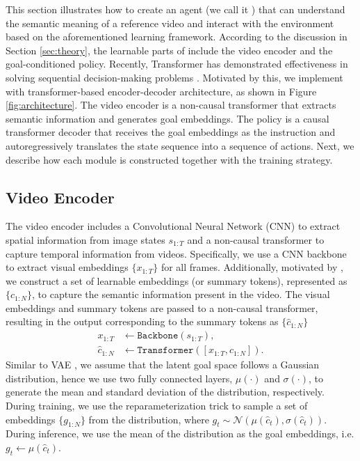 \documentclass[11pt, a4paper, logo, one column]{craftjarvis}
\begin{document}
This section illustrates how to create an agent (we call it \agent) that can understand the semantic meaning of a reference video and interact with the environment based on the aforementioned learning framework. According to the discussion in Section \ref{sec:theory}, the learnable parts of \agent include the video encoder and the goal-conditioned policy. Recently, Transformer \citep{transformer} has demonstrated effectiveness in solving sequential decision-making problems \citep{stable, dt, rt-1}. 
Motivated by this, we implement \agent with transformer-based encoder-decoder architecture, as shown in Figure \ref{fig:architecture}. The video encoder is a non-causal transformer that extracts semantic information and generates goal embeddings. The policy is a causal transformer decoder that receives the goal embeddings as the instruction and autoregressively translates the state sequence into a sequence of actions. Next, we describe how each module is constructed together with the training strategy. 

\subsection{Video Encoder}
The video encoder includes a Convolutional Neural Network (CNN) to extract spatial information from image states $s_{1:T}$ and a non-causal transformer to capture temporal information from videos. 
Specifically, we use a CNN backbone to extract visual embeddings $\{x_{1:T}\}$ for all frames.
Additionally, motivated by \cite{bert, vit}, we construct a set of learnable embeddings (or summary tokens), represented as $\{c_{1:N}\}$, to capture the semantic information present in the video. The visual embeddings and summary tokens are passed to a non-causal transformer, resulting in the output corresponding to the summary tokens as $\{\hat{c}_{1:N}\}$
\begin{equation}\label{eq:video_encoder}
\begin{aligned}
x_{1:T} &\leftarrow \texttt{Backbone}(s_{1:T}), \\
\hat{c}_{1:N} &\leftarrow \texttt{Transformer}(\left[ x_{1:T}, c_{1:N} \right]). 
\end{aligned}
\end{equation}
Similar to VAE \citep{vae}, we assume that the latent goal space follows a Gaussian distribution, hence we use two fully connected layers, $\mu(\cdot)$ and $\sigma(\cdot)$, to generate the mean and standard deviation of the distribution, respectively. During training, we use the reparameterization trick to sample a set of embeddings $\{g_{1:N}\}$ from the distribution, where $g_{t} \sim \mathcal{N}(\mu(\hat{c}_{t}), \sigma(\hat{c}_{t}))$. During inference, we use the mean of the distribution as the goal embeddings, i.e. $g_{t} \leftarrow \mu(\hat{c}_{t})$. 
\end{document}
